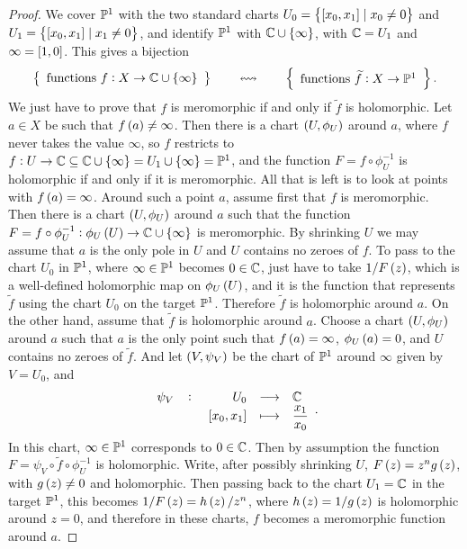 \begin{proof}
We cover $ \P^1 $ with the two standard charts $ U_0 = \cbr{\sbr{x_0, x_1} \mid x_0 \ne 0} $ and $ U_1 = \cbr{\sbr{x_0, x_1} \mid x_1 \ne 0} $, and identify $ \P^1 $ with $ \C \cup \cbr{\infty} $, with $ \C = U_1 $ and $ \infty = \sbr{1, 0} $. This gives a bijection
$$ \correspondence{\text{functions} \ f : X \to \C \cup \cbr{\infty}}{\text{functions} \ \widetilde{f} : X \to \P^1}. $$
We just have to prove that $ f $ is meromorphic if and only if $ \widetilde{f} $ is holomorphic. Let $ a \in X $ be such that $ f\br{a} \ne \infty $. Then there is a chart $ \br{U, \phi_U} $ around $ a $, where $ f $ never takes the value $ \infty $, so $ f $ restricts to $ f : U \to \C \subseteq \C \cup \cbr{\infty} = U_1 \cup \cbr{\infty} = \P^1 $, and the function $ F = f \circ \phi_U^{-1} $ is holomorphic if and only if it is meromorphic. All that is left is to look at points with $ f\br{a} = \infty $. Around such a point $ a $, assume first that $ f $ is meromorphic. Then there is a chart $ \br{U, \phi_U} $ around $ a $ such that the function $ F = f \circ \phi_U^{-1} : \phi_U\br{U} \to \C \cup \cbr{\infty} $ is meromorphic. By shrinking $ U $ we may assume that $ a $ is the only pole in $ U $ and $ U $ contains no zeroes of $ f $. To pass to the chart $ U_0 $ in $ \P^1 $, where $ \infty \in \P^1 $ becomes $ 0 \in \C $, just have to take $ 1 / F\br{z} $, which is a well-defined holomorphic map on $ \phi_U\br{U} $, and it is the function that represents $ \widetilde{f} $ using the chart $ U_0 $ on the target $ \P^1 $. Therefore $ \widetilde{f} $ is holomorphic around $ a $. On the other hand, assume that $ \widetilde{f} $ is holomorphic around $ a $. Choose a chart $ \br{U, \phi_U} $ around $ a $ such that $ a $ is the only point such that $ f\br{a} = \infty $, $ \phi_U\br{a} = 0 $, and $ U $ contains no zeroes of $ \widetilde{f} $. And let $ \br{V, \psi_V} $ be the chart of $ \P^1 $ around $ \infty $ given by $ V = U_0 $, and
$$ \function[\psi_V]{U_0}{\C}{\sbr{x_0, x_1}}{\dfrac{x_1}{x_0}}. $$
In this chart, $ \infty \in \P^1 $ corresponds to $ 0 \in \C $. Then by assumption the function $ F = \psi_V \circ \widetilde{f} \circ \phi_U^{-1} $ is holomorphic. Write, after possibly shrinking $ U $, $ F\br{z} = z^ng\br{z} $, with $ g\br{z} \ne 0 $ and holomorphic. Then passing back to the chart $ U_1 = \C $ in the target $ \P^1 $, this becomes $ 1 / F\br{z}  = h\br{z} / z^n $, where $ h\br{z} = 1 / g\br{z} $ is holomorphic around $ z = 0 $, and therefore in these charts, $ f $ becomes a meromorphic function around $ a $.
\end{proof}

